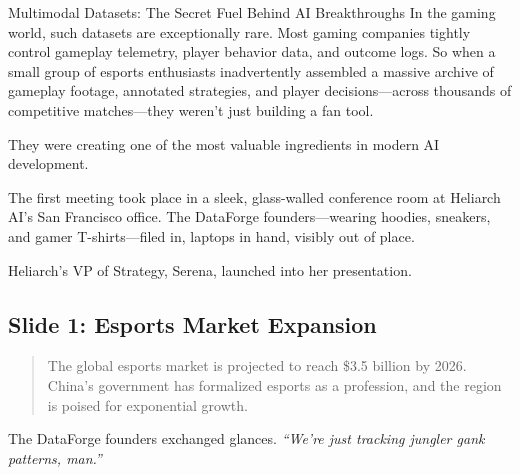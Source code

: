\begin{HistoricalSidebar}{Multimodal Datasets: The Secret Fuel Behind AI Breakthroughs}
    In the gaming world, such datasets are exceptionally rare. Most gaming companies tightly control gameplay telemetry, player behavior data, and outcome logs. So when a small group of esports enthusiasts inadvertently assembled a massive archive of gameplay footage, annotated strategies, and player decisions—across thousands of competitive matches—they weren’t just building a fan tool.

    \medskip
    
    They were creating one of the most valuable ingredients in modern AI development.
    
\end{HistoricalSidebar}


The first meeting took place in a sleek, glass-walled conference room at Heliarch AI’s San Francisco office. The DataForge founders—wearing hoodies, sneakers, and gamer T-shirts—filed in, laptops in hand, visibly out of place.  

Heliarch’s VP of Strategy, Serena, launched into her presentation.

\subsection{Slide 1: Esports Market Expansion}

\begin{quote}
The global esports market is projected to reach \$3.5 billion by 2026. China’s government has formalized esports as a profession, and the region is poised for exponential growth.
\end{quote}
    
The DataForge founders exchanged glances. \textit{``We’re just tracking jungler gank patterns, man.''}

\medskip

